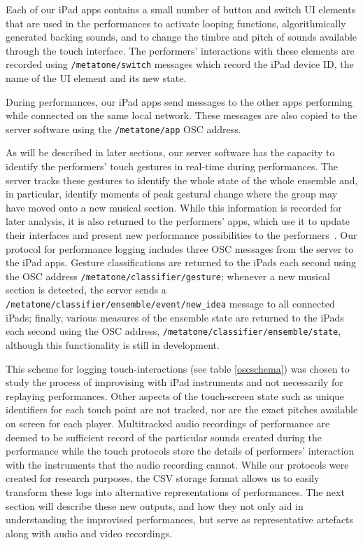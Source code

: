 \documentclass[graybox]{svmult}
\begin{document}
Each of our iPad apps contains a small number of button and switch UI
elements that are used in the performances to activate looping
functions, algorithmically generated backing sounds, and to change the
timbre and pitch of sounds available through the touch interface. The
performers' interactions with these elements are recorded using
\texttt{/metatone/switch} messages which record the iPad device ID,
the name of the UI element and its new state.

During performances, our iPad apps send messages to the other apps
performing while connected on the same local network. These messages
are also copied to the server software using the
\texttt{/metatone/app} OSC address.

As will be described in later sections, our server software has the
capacity to identify the performers' touch gestures in real-time
during performances. The server tracks these gestures to identify the
whole state of the whole ensemble and, in particular, identify moments
of peak gestural change where the group may have moved onto a new
musical section. While this information is recorded for later
analysis, it is also returned to the performers' apps, which use it to
update their interfaces and present new performance possibilities to
the performers~\cite{Martin:2015jk}. Our protocol for performance logging includes three
OSC messages from the server to the iPad apps. Gesture classifications
are returned to the iPads each second using the OSC address
\texttt{/metatone/classifier/gesture}; whenever a new musical section
is detected, the server sends a
\texttt{/metatone/classifier/ensemble/event/new\_idea} message to all
connected iPads; finally, various measures of the ensemble state are
returned to the iPads each second using the OSC address,
\texttt{/metatone/classifier/ensemble/state}, although this
functionality is still in development.

This scheme for logging touch-interactions (see table \ref{oscschema})
was chosen to study the process of improvising with iPad instruments
and not necessarily for replaying performances. Other aspects of the
touch-screen state such as unique identifiers for each touch point are
not tracked, nor are the exact pitches available on screen for each
player. Multitracked audio recordings of performance are deemed to be
sufficient record of the particular sounds created during the
performance while the touch protocols store the details of performers'
interaction with the instruments that the audio recording cannot.
While our protocols were created for research purposes, the CSV
storage format allows us to easily transform these logs into
alternative representations of performances.
The next section will describe these new outputs, and how they not
only aid in understanding the improvised performances, but serve as
representative artefacts along with audio and video recordings.
\end{document}
